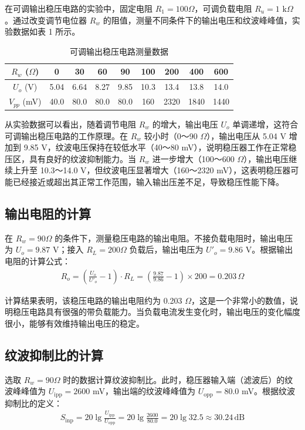 ﻿\documentclass[12pt,a4paper]{article}
\begin{document}
在可调输出稳压电路的实验中，固定电阻 $R_1 = 100 \Omega$，可调负载电阻 $R_u = 1 \text{ k}\Omega$。通过改变调节电位器 $R_w$ 的阻值，测量不同条件下的输出电压和纹波峰峰值，实验数据如表 1 所示。

\begin{table}[H]
\centering
\begin{tabular}{|c|c|c|c|c|c|c|c|c|}
\hline
$R_w$ ($\Omega$) & 0 & 30 & 60 & 90 & 100 & 200 & 400 & 600 \\
\hline
$U_o$ (V) & 5.04 & 6.64 & 8.27 & 9.85 & 10.3 & 13.4 & 13.8 & 14.0 \\
\hline
$V_{pp}$ (mV) & 40.0 & 80.0 & 80.0 & 80.0 & 160 & 2320 & 1840 & 1440 \\
\hline
\end{tabular}
\caption{可调输出稳压电路测量数据}
\end{table}

从实验数据可以看出，随着调节电阻 $R_w$ 的增大，输出电压 $U_o$ 单调递增，这符合可调输出稳压电路的工作原理。在 $R_w$ 较小时（0～90 $\Omega$），输出电压从 5.04 V 增加到 9.85 V，纹波电压保持在较低水平（40～80 mV），说明稳压器工作在正常稳压区，具有良好的纹波抑制能力。当 $R_w$ 进一步增大（100～600 $\Omega$），输出电压继续上升至 10.3～14.0 V，但纹波电压显著增大（160～2320 mV），这表明稳压器可能已经接近或超出其正常工作范围，输入输出压差不足，导致稳压性能下降。

\subsection{输出电阻的计算}

在 $R_w = 90 \Omega$ 的条件下，测量稳压电路的输出电阻。不接负载电阻时，输出电压为 $U_o = 9.87$ V；接入 $R_L = 200 \Omega$ 负载后，输出电压为 $U'_o = 9.86$ V。根据输出电阻的计算公式：
\begin{align}
R_o = \left(\frac{U_o}{U'_o} - 1\right) \cdot R_L = \left(\frac{9.87}{9.86} - 1\right) \times 200 = 0.203 \, \Omega
\end{align}

计算结果表明，该稳压电路的输出电阻约为 0.203 $\Omega$，这是一个非常小的数值，说明稳压电路具有很强的带负载能力。当负载电流发生变化时，输出电压的变化幅度很小，能够有效维持输出电压的稳定。

\subsection{纹波抑制比的计算}

选取 $R_w = 90 \Omega$ 时的数据计算纹波抑制比。此时，稳压器输入端（滤波后）的纹波峰峰值为 $U_{\text{ipp}} = 2600$ mV，输出端的纹波峰峰值为 $U_{\text{opp}} = 80.0$ mV。根据纹波抑制比的定义：
\begin{align}
S_{\text{inp}} = 20 \lg \frac{U_{\text{ipp}}}{U_{\text{opp}}} = 20 \lg \frac{2600}{80.0} = 20 \lg 32.5 \approx 30.24 \, \text{dB}
\end{align}
\end{document}
